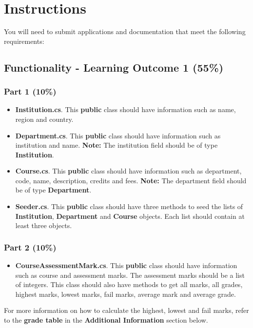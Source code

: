 \documentclass{article}
\begin{document}
\section*{Instructions}
You will need to submit applications and documentation that meet the following requirements:

\subsection*{Functionality - Learning Outcome 1 (55\%)}

\subsubsection*{Part 1 (10\%)}
\begin{itemize}
    \item \textbf{Institution.cs}. This \textbf{public} class should have information such as name, region and country.
    \item \textbf{Department.cs}. This \textbf{public} class should have information such as institution and name. \textbf{Note:} The institution field should be of type \textbf{Institution}.
    \item \textbf{Course.cs}. This \textbf{public} class should have information such as department, code, name, description, credits and fees. \textbf{Note:} The department field should be of type \textbf{Department}.
    \item \textbf{Seeder.cs}. This \textbf{public} class should have three methods to seed the lists of \textbf{Institution}, \textbf{Department} and \textbf{Course} objects. Each list should contain at least three objects. 
\end{itemize}

\subsubsection*{Part 2 (10\%)}
\begin{itemize}
    \item \textbf{CourseAssessmentMark.cs}. This \textbf{public} class should have information such as course and assessment marks. The assessment marks should be a list of integers. This class should also have methods to get all marks, all grades, highest marks, lowest marks, fail marks, average mark and average grade. 
\end{itemize}

For more information on how to calculate the highest, lowest and fail marks, refer to the \textbf{grade table} in the \textbf{Additional Information} section below.
\end{document}

